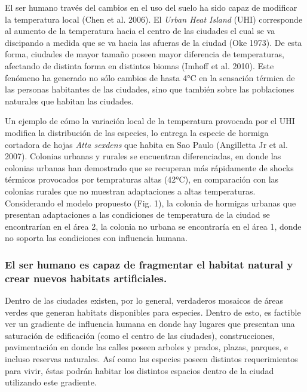 \documentclass[]{article}
\begin{document}
El ser humano través del cambios en el uso del suelo ha sido capaz de
modificar la temperatura local (Chen et al. 2006). El \emph{Urban Heat
Island} (UHI) corresponde al aumento de la temperatura hacia el centro
de las ciudades el cual se va discipando a medida que se va hacia las
afueras de la ciudad (Oke 1973). De esta forma, ciudades de mayor tamaño
poseen mayor diferencia de temperaturas, afectando de distinta forma en
distintos biomas (Imhoff et al. 2010). Este fenómeno ha generado no sólo
cambios de hasta 4°C en la sensación térmica de las personas habitantes
de las ciudades, sino que también sobre las poblaciones naturales que
habitan las ciudades.

Un ejemplo de cómo la variación local de la temperatura provocada por el
UHI modifica la distribución de las especies, lo entrega la especie de
hormiga cortadora de hojas \emph{Atta sexdens} que habita en Sao Paulo
(Angilletta Jr et al. 2007). Colonias urbanas y rurales se encuentran
diferenciadas, en donde las colonias urbanas han demostrado que se
recuperan más rápidamente de shocks térmicos provocados por tempraturas
altas (42°C), en comparación con las colonias rurales que no muestran
adaptaciones a altas temperaturas. Considerando el modelo propuesto
(Fig. 1), la colonia de hormigas urbanas que presentan adaptaciones a
las condiciones de temperatura de la ciudad se encontrarían en el área
2, la colonia no urbana se encontraría en el área 1, donde no soporta
las condiciones con influencia humana.

\subsubsection{El ser humano es capaz de fragmentar el habitat natural y
crear nuevos habitats
artificiales.}\label{el-ser-humano-es-capaz-de-fragmentar-el-habitat-natural-y-crear-nuevos-habitats-artificiales.}

Dentro de las ciudades existen, por lo general, verdaderos mosaicos de
áreas verdes que generan habitats disponibles para especies. Dentro de
esto, es factible ver un gradiente de influencia humana en donde hay
lugares que presentan una saturación de edificación (como el centro de
las ciudades), construcciones, pavimentación en donde las calles poseen
arboles y prados, plazas, parques, e incluso reservas naturales. Así
como las especies poseen distintos requerimientos para vivir, éstas
podrán habitar los distintos espacios dentro de la ciudad utilizando
este gradiente.
\end{document}
